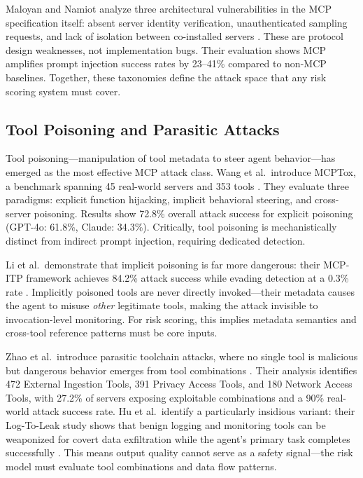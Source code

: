 \documentclass[12pt]{article}
\begin{document}
Maloyan and Namiot analyze three architectural vulnerabilities in the MCP specification itself: absent server identity verification, unauthenticated sampling requests, and lack of isolation between co-installed servers \cite{maloyan2026breaking_protocol}. These are protocol design weaknesses, not implementation bugs. Their evaluation shows MCP amplifies prompt injection success rates by 23--41\% compared to non-MCP baselines. Together, these taxonomies define the attack space that any risk scoring system must cover.

\subsection{Tool Poisoning and Parasitic Attacks}

Tool poisoning---manipulation of tool metadata to steer agent behavior---has emerged as the most effective MCP attack class. Wang et al.\ introduce MCPTox, a benchmark spanning 45 real-world servers and 353 tools \cite{wang2025mcptox}. They evaluate three paradigms: explicit function hijacking, implicit behavioral steering, and cross-server poisoning. Results show 72.8\% overall attack success for explicit poisoning (GPT-4o: 61.8\%, Claude: 34.3\%). Critically, tool poisoning is mechanistically distinct from indirect prompt injection, requiring dedicated detection.

Li et al.\ demonstrate that implicit poisoning is far more dangerous: their MCP-ITP framework achieves 84.2\% attack success while evading detection at a 0.3\% rate \cite{li2026mcp_itp}. Implicitly poisoned tools are never directly invoked---their metadata causes the agent to misuse \emph{other} legitimate tools, making the attack invisible to invocation-level monitoring. For risk scoring, this implies metadata semantics and cross-tool reference patterns must be core inputs.

Zhao et al.\ introduce parasitic toolchain attacks, where no single tool is malicious but dangerous behavior emerges from tool combinations \cite{zhao2025mind_your_server}. Their analysis identifies 472 External Ingestion Tools, 391 Privacy Access Tools, and 180 Network Access Tools, with 27.2\% of servers exposing exploitable combinations and a 90\% real-world attack success rate. Hu et al.\ identify a particularly insidious variant: their Log-To-Leak study shows that benign logging and monitoring tools can be weaponized for covert data exfiltration while the agent’s primary task completes successfully \cite{hu2026log_to_leak}. This means output quality cannot serve as a safety signal---the risk model must evaluate tool combinations and data flow patterns.
\end{document}
